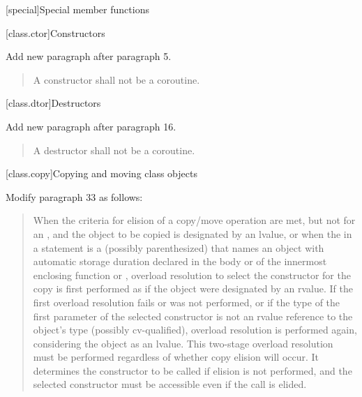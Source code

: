 
\setcounter{chapter}{11}
[special]{Special member functions}

\setcounter{section}{0}
[class.ctor]{Constructors}%

Add new paragraph after paragraph 5.

	\setcounter{Paras}{5}
\begin{quote}
	\pnum A constructor shall not be a coroutine.
\end{quote}

\setcounter{section}{3}
[class.dtor]{Destructors}%

Add new paragraph after paragraph 16.

	\setcounter{Paras}{16}
\begin{quote}
	\pnum A destructor shall not be a coroutine.
\end{quote}

\setcounter{section}{7}
[class.copy]{Copying and moving class objects}%

Modify paragraph 33 as follows:

\begin{quote}
\setcounter{Paras}{32}
\pnum
When the criteria for elision of a copy/move operation are met,
but not for an ,
and the object
to be copied is designated by an lvalue,
or when the  in a    statement
is a (possibly parenthesized) 
that names an object with automatic storage duration declared in the body
or  of the innermost enclosing
function or ,
overload resolution to select the constructor
for the copy  is first performed as if the object were designated by an rvalue.
If the first overload resolution fails or was not performed,
or if the type of the first parameter of the selected
constructor is not an rvalue reference to the object's type (possibly cv-qualified),
overload resolution is performed again, considering the object as an lvalue.
\enternote This two-stage overload resolution must be performed regardless
of whether copy elision will occur. It determines the constructor to be called if
elision is not performed, and the selected constructor must be accessible even if
the call is elided. \exitnote
\end{quote}